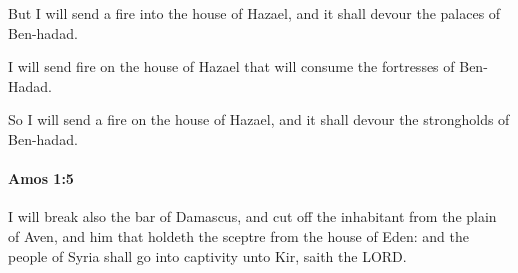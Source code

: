 			\begin{versebox}
					\item[BHS] 
					\item[LXX] 
					\item[ASV] But I will send a fire into the house of Hazael, and it shall devour the palaces of Ben-hadad.
					\item[NIV] I will send fire on the house of Hazael that will consume the fortresses of Ben-Hadad.
					\item[NRSV] So I will send a fire on the house of Hazael, and it shall devour the strongholds of Ben-hadad.
			\end{versebox}

		\paragraph{Amos 1:5} %
			\label{AMOS-1-5}

			I will break also the bar of Damascus, and cut off the inhabitant from the plain of Aven, and him that holdeth the sceptre from the house of Eden: and the people of Syria shall go into captivity unto Kir, saith the LORD.

